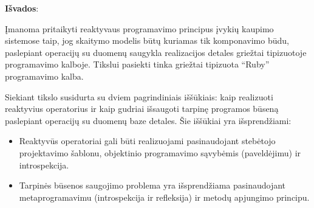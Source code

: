 \documentclass{VUMIFPSmagistrinis}
\begin{document}
\textbf{Išvados}:

Įmanoma pritaikyti reaktyvaus programavimo principus įvykių kaupimo sistemose taip, jog skaitymo modelis būtų kuriamas tik komponavimo būdu, paslepiant operacijų su duomenų saugykla realizacijos detales griežtai tipizuotoje programavimo kalboje. Tikslui pasiekti tinka griežtai tipizuota ``Ruby'' programavimo kalba.

Siekiant tikslo susidurta su dviem pagrindiniais iššūkiais: kaip realizuoti reaktyvius operatorius ir kaip gudriai išsaugoti tarpinę programos būseną paslepiant operacijų su duomenų baze detales. Šie iššūkiai yra išsprendžiami:

\begin{itemize}
  \item Reaktyvūs operatoriai gali būti realizuojami pasinaudojant stebėtojo projektavimo šablonu, objektinio programavimo sąvybėmis (paveldėjimu) ir introspekcija.
  \item Tarpinės būsenos saugojimo problema yra išsprendžiama pasinaudojant metaprogramavimu (introspekcija ir refleksija) ir metodų apjungimo principu.
\end{itemize}

\printbibliography[heading=bibintoc]  %




\end{document}
